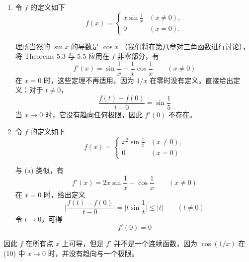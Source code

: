 \documentclass[../poma-notes.tex]{subfiles}
\begin{document}
\begin{examples}
  \begin{enumerate}[label=(\alph*)]
    \item 令 $f$ 的定义如下
          \begin{equation}
            f(x) =
            \begin{cases}
              x \sin \frac{1}{x} & (x \ne 0), \\
              0                  & (x = 0).
            \end{cases}
          \end{equation}

          理所当然的 $\sin x$ 的导数是 $\cos x$ （我们将在第八章对三角函数进行讨论），将 Theorems 5.3 与 5.5 应用在 $f$ 非零部分，有
          \begin{equation}
            f'(x) = \sin\frac{1}{x} - \frac{1}{x}\cos\frac{1}{x} \qquad (x \ne 0)
          \end{equation}
          在 $x = 0$ 时，这些定理不再适用，因为 $1/x$ 在零时没有定义。直接给出定义：对于 $t \ne 0$，
          \[
            \frac{f(t) - f(0)}{t - 0} = \sin\frac{1}{5}
          \]
          当 $x \to 0$ 时，它没有趋向任何极限，因此 $f'(0)$ 不存在。
    \item 令 $f$ 的定义如下
          \begin{equation}
            f(x) =
            \begin{cases}
              x^2 \sin\frac{1}{x} & (x \ne 0), \\
              0                   & (x = 0)
            \end{cases}
          \end{equation}

          与 (a) 类似，有
          \begin{equation}
            f'(x) = 2x \sin\frac{1}{x} - \cos\frac{1}{x} \qquad (x \ne 0)
          \end{equation}
          在 $x = 0$ 时，给出定义
          \[
            \biggl| \frac{f(t) - f(0)}{t - 0} \biggr| = \biggl| t \sin\frac{1}{t} \biggr| \le |t| \qquad (t \ne 0)
          \]
          令 $t \to 0$，可得
          \begin{equation}
            f'(0) = 0
          \end{equation}
  \end{enumerate}

  因此 $f$ 在所有点 $x$ 上可导，但是 $f'$ 并不是一个连续函数，因为 $\cos(1/x)$ 在 (10) 中 $x \to 0$ 时，并没有趋向与一个极限。
\end{examples}
\end{document}
